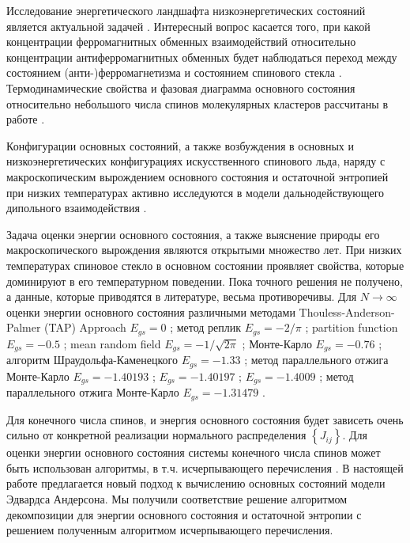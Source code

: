 \documentclass[utf8, babel, sor, jor, amsmath, amssymb, reprint]{elsarticle} %
\begin{document}
Исследование энергетического ландшафта низкоэнергетических состояний является актуальной задачей \cite{biswas2023energy}. Интересный вопрос касается того, при какой концентрации ферромагнитных обменных взаимодействий относительно концентрации антиферромагнитных обменных будет наблюдаться переход между состоянием (анти-)ферромагнетизма и состоянием спинового стекла \cite{zimmer2022role}. Термодинамические свойства и фазовая диаграмма основного состояния относительно небольшого числа спинов молекулярных кластеров рассчитаны в работе \cite{dias2023ground}.

Конфигурации основных состояний, а также возбуждения в основных и низкоэнергетических конфигурациях искусственного спинового льда, наряду с макроскопическим вырождением основного состояния и остаточной энтропией  при низких температурах активно исследуются в модели дальнодействующего дипольного взаимодействия \cite{makarova2021low, singh2024micromagnetic}.

Задача оценки энергии основного состояния, а также выяснение природы его макроскопического вырождения являются открытыми множество лет. При низких температурах спиновое стекло в основном состоянии проявляет свойства, которые доминируют в его температурном поведении. Пока точного решения не получено, а данные, которые приводятся в литературе, весьма противоречивы. Для $N\rightarrow \infty$ оценки энергии основного состояния различными методами Thouless-Anderson-Palmer (TAP) Approach
$E_{gs}=0$ \cite{thouless1977solution}; 
метод реплик $E_{gs}=-2/\pi$ \cite{sherrington1975solvable}; partition function $E_{gs}=-0.5$ \cite{tanaka1980analytic}; mean random field $E_{gs}=-1/\sqrt{2\pi}$ \cite{klein1976comparison}; 
Монте-Карло $E_{gs}=-0.76$ \cite{kirkpatrick1978infinite};
алгоритм Шраудольфа-Каменецкого $E_{gs}=-1.33$ \cite{karandashev2019global}; метод параллельного отжига Монте-Карло $E_{gs}=-1.40193$ \cite{palmer1999ground}; $E_{gs}=-1.40197$ \cite{campbell2004energy}; $E_{gs}=-1.4009$ \cite{roma2009ground}; метод параллельного отжига Монте-Карло  $E_{gs}=-1.31479$ \cite{roma2009ground}. 

Для конечного числа спинов, и энергия основного состояния будет зависеть очень сильно от конкретной реализации нормального распределения $\left\lbrace J_{ij} \right\rbrace $. Для оценки энергии основного состояния системы конечного числа спинов может быть использован алгоритмы, в т.ч. исчерпывающего перечисления \cite{padalko2021parallel}. В настоящей работе предлагается новый подход к вычислению основных состояний модели Эдвардса Андерсона. Мы получили соответствие решение алгоритмом декомпозиции для энергии основного состояния и остаточной энтропии с решением полученным алгоритмом исчерпывающего перечисления.  
\end{document}

